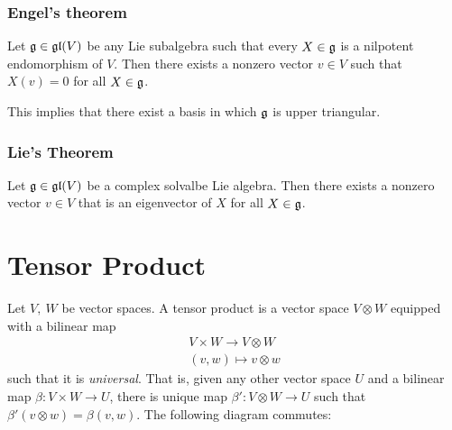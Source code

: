 \subsection{Engel's theorem}
\label{sub:engel_s_theorem}

\begin{theorem}
    Let $\mathfrak{g}\in \mathfrak{gl}(V)$ be any Lie subalgebra such that every $X\in \mathfrak{g}$ is a nilpotent endomorphism of $V$. Then there exists a nonzero vector $v\in V$ such that $X(v)=0$ for all $X\in\mathfrak{g}$.
\end{theorem}
\begin{corollary}
    
\end{corollary}
    This implies that there exist a basis in which $\mathfrak{g}$ is upper triangular.

\subsection{Lie's Theorem}
\label{sub:lie_s_theorem}
\begin{theorem}
    Let  $\mathfrak{g}\in\mathfrak{gl}(V)$ be a complex solvalbe Lie algebra. Then there exists a nonzero vector $v\in V$ that is an eigenvector of $X$ for all $X\in \mathfrak{g}$.
\end{theorem}























\appendix
\chapter{Tensor Product}
\label{cha:tensor_product}

Let $V,\ W$ be vector spaces. A tensor product is a vector space $V\otimes W$ equipped with a bilinear map
\begin{align}
    V\times W \to V\otimes W\\
    (v,w) \mapsto v\otimes w
\end{align}
such that it is \emph{universal}. That is, given any other vector space $U$ and a bilinear map $\beta: V\times W\to U$, there is unique map $\beta': V\otimes W \to U$ such that $\beta'(v\otimes w) = \beta(v,w)$. The following diagram commutes:

